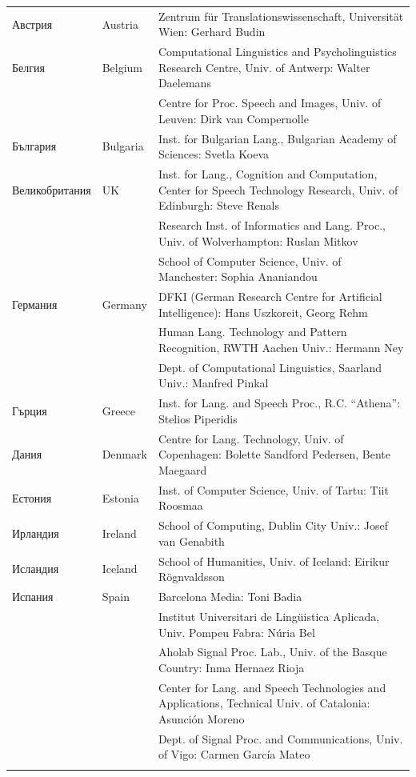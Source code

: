 \small
\small
\begin{longtable}{llp{105mm}}
Австрия & \textcolor{grey1}{Austria} & Zentrum für Translationswissenschaft, Universität Wien: Gerhard Budin\\ \addlinespace 
Белгия & \textcolor{grey1}{Belgium} & Computational Linguistics and Psycholinguistics Research Centre, Univ. of Antwerp: Walter Daelemans\\ \addlinespace   & & Centre for Proc. Speech and Images, Univ. of Leuven: Dirk van Compernolle \\ \addlinespace
България & \textcolor{grey1}{Bulgaria} & Inst. for Bulgarian Lang., Bulgarian Academy of Sciences: Svetla Koeva \\ \addlinespace
Великобритания & \textcolor{grey1}{UK} & Inst. for Lang., Cognition and Computation, Center for Speech Technology Research, Univ. of Edinburgh: Steve Renals \\ \addlinespace & & Research Inst. of Informatics and Lang. Proc., Univ. of Wolverhampton: Ruslan Mitkov \\ \addlinespace & & School of Computer Science, Univ. of Manchester: Sophia Ananiandou \\ \addlinespace 
Германия & \textcolor{grey1}{Germany} & DFKI (German Research Centre for Artificial Intelligence): Hans Uszkoreit, Georg Rehm\\ \addlinespace   & & Human Lang. Technology and Pattern Recognition, RWTH Aachen Univ.: Hermann Ney \\ \addlinespace   & & Dept. of Computational Linguistics, Saarland Univ.: Manfred Pinkal\\ \addlinespace 
Гърция & \textcolor{grey1}{Greece} & Inst. for Lang. and Speech Proc., R.C. “Athena”: Stelios Piperidis\\ \addlinespace
Дания &  \textcolor{grey1}{Denmark} & Centre for Lang. Technology, Univ. of Copenhagen: Bolette Sandford Pedersen, Bente Maegaard\\ \addlinespace
Естония & \textcolor{grey1}{Estonia} & Inst. of Computer Science, Univ. of Tartu: Tiit Roosmaa\\ \addlinespace
Ирландия & \textcolor{grey1}{Ireland} & School of Computing, Dublin City Univ.: Josef van Genabith\\ \addlinespace
Исландия & \textcolor{grey1}{Iceland} & School of Humanities, Univ. of Iceland: Eirikur Rögnvaldsson\\ \addlinespace
Испания & \textcolor{grey1}{Spain} & Barcelona Media: Toni Badia \\ \addlinespace & & Institut Universitari de Lingüistica Aplicada, Univ. Pompeu Fabra: Núria Bel \\ \addlinespace & & Aholab Signal Proc. Lab., Univ. of the Basque Country: Inma Hernaez Rioja \\ \addlinespace & & Center for Lang. and Speech Technologies and Applications, Technical Univ. of Catalonia: Asunción Moreno \\ \addlinespace & & Dept. of Signal Proc. and Communications, Univ. of Vigo: Carmen García Mateo \\ \addlinespace 

\end{longtable}
